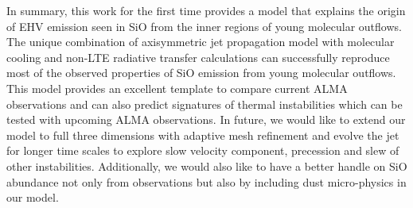 \documentclass[useAMS,usenatbib]{mn2e}
\begin{document}
In summary, this work for the first time provides a model
that explains the origin of EHV emission seen in SiO from 
the inner regions of young molecular outflows. The unique combination
of axisymmetric jet propagation model with molecular cooling and
non-LTE radiative transfer calculations can successfully reproduce most
of the observed properties of SiO emission from young molecular
outflows. This model provides an excellent
template to compare current ALMA observations and can also predict
signatures of thermal instabilities which can be tested with upcoming
ALMA observations. In future, we would like to extend our
model to full three dimensions with adaptive mesh refinement
and evolve the jet for longer time scales to explore slow velocity 
component, precession and slew of other instabilities. Additionally, we would also like to have
a better handle on SiO abundance not only from observations but also
by including dust micro-physics in our model. 




\appendix
\end{document}
